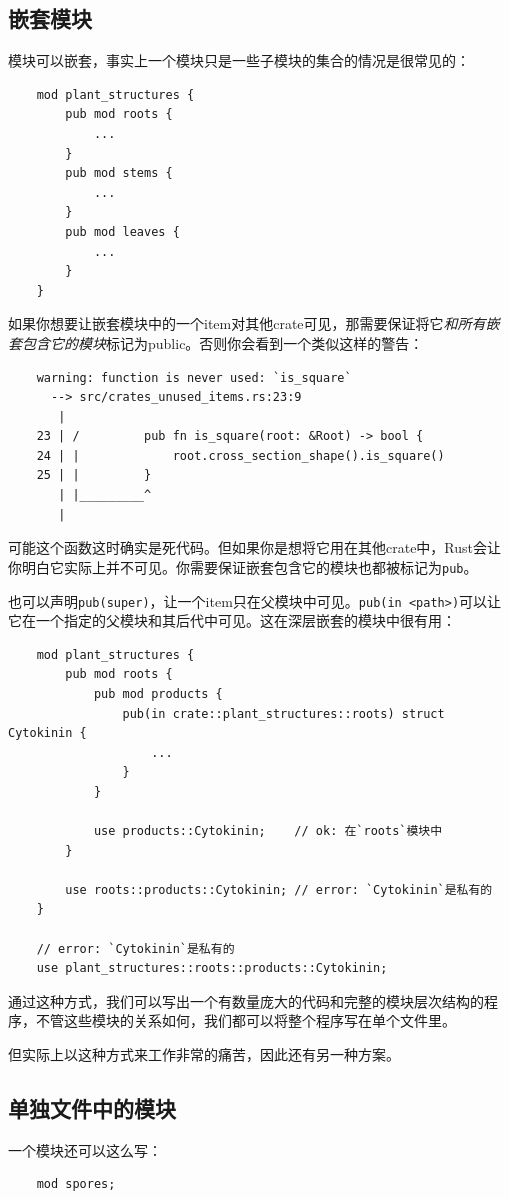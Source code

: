 \subsection{嵌套模块}

模块可以嵌套，事实上一个模块只是一些子模块的集合的情况是很常见的：
\begin{verbatim}
    mod plant_structures {
        pub mod roots {
            ...
        }
        pub mod stems {
            ...
        }
        pub mod leaves {
            ...
        }
    }
\end{verbatim}

如果你想要让嵌套模块中的一个item对其他crate可见，那需要保证将它\emph{和所有嵌套包含它的模块}标记为public。否则你会看到一个类似这样的警告：
\begin{verbatim}
    warning: function is never used: `is_square`
      --> src/crates_unused_items.rs:23:9
       |
    23 | /         pub fn is_square(root: &Root) -> bool {
    24 | |             root.cross_section_shape().is_square()
    25 | |         }
       | |_________^
       |
\end{verbatim}

可能这个函数这时确实是死代码。但如果你是想将它用在其他crate中，Rust会让你明白它实际上并不可见。你需要保证嵌套包含它的模块也都被标记为\texttt{pub}。

也可以声明\texttt{pub(super)}，让一个item只在父模块中可见。\texttt{pub(in <path>)}可以让它在一个指定的父模块和其后代中可见。这在深层嵌套的模块中很有用：
\begin{verbatim}
    mod plant_structures {
        pub mod roots {
            pub mod products {
                pub(in crate::plant_structures::roots) struct Cytokinin {
                    ...
                }
            }

            use products::Cytokinin;    // ok: 在`roots`模块中
        }

        use roots::products::Cytokinin; // error: `Cytokinin`是私有的
    }

    // error: `Cytokinin`是私有的
    use plant_structures::roots::products::Cytokinin;
\end{verbatim}

通过这种方式，我们可以写出一个有数量庞大的代码和完整的模块层次结构的程序，不管这些模块的关系如何，我们都可以将整个程序写在单个文件里。

但实际上以这种方式来工作非常的痛苦，因此还有另一种方案。

\subsection{单独文件中的模块}\label{ModInFile}
一个模块还可以这么写：
\begin{verbatim}
    mod spores;
\end{verbatim}

